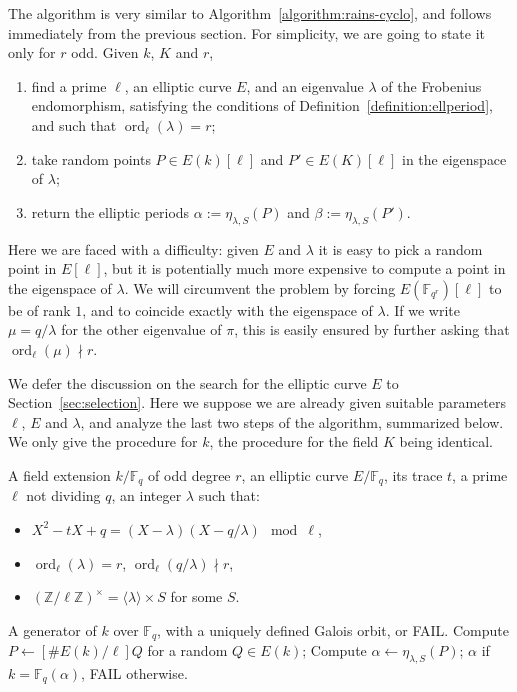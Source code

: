 \documentclass[12pt]{article}
\theoremstyle{plain}
\theoremstyle{definition}
\DeclareMathOperator{\order}{ord} %
\def\Z{\ensuremath{\mathbb{Z}}}
\def\F{\ensuremath{\mathbb{F}}}
\newcounter{algorithm}
\begin{document}
The algorithm is very similar to
Algorithm~\ref{algorithm:rains-cyclo}, and follows immediately from
the previous section. For simplicity, we are going to state it only
for $r$ odd. Given $k$, $K$ and $r$,
\begin{enumerate}
\item find a prime $\ell$, an elliptic curve $E$, and an eigenvalue
  $\lambda$ of the Frobenius endomorphism, satisfying the conditions
  of Definition~\ref{definition:ellperiod}, and such that
  $\order_\ell(\lambda)=r$;
\item take random points $P\in E(k)[\ell]$ and $P'\in E(K)[\ell]$ in
  the eigenspace of $\lambda$;
\item return the elliptic periods $\alpha := \eta_{\lambda,S}(P)$ and
  $\beta:= \eta_{\lambda,S}(P')$.
\end{enumerate}

Here we are faced with a difficulty: given $E$ and $\lambda$ it is
easy to pick a random point in $E[\ell]$, but it is potentially much
more expensive to compute a point in the eigenspace of $\lambda$. We
will circumvent the problem by forcing $E(\F_{q^r})[\ell]$ to be of
rank $1$, and to coincide exactly with the eigenspace of $\lambda$.
If we write $\mu = q/\lambda$ for the other eigenvalue of $\pi$, this
is easily ensured by further asking that $\order_\ell(\mu) \nmid r$.

We defer the discussion on the search for the elliptic curve $E$ to
Section~\ref{sec:selection}. Here we suppose we are already given
suitable parameters $\ell$, $E$ and $\lambda$, and analyze the last
two steps of the algorithm, summarized below.  We only give the
procedure for $k$, the procedure for the field $K$ being
identical.

\begin{algorithm}
\label{algorithm:compell}
  \begin{algorithmic}[1]
    \REQUIRE A field extension $k/\F_q$ of odd degree $r$,
    an elliptic curve $E/\F_q$, its trace $t$, a prime $\ell$ not dividing $q$,
    an integer $\lambda$ such that:
    \begin{itemize}
    \item $X^2 - tX + q = (X-\lambda)(X-q/\lambda) \mod\ell$,
    \item $\order_\ell(\lambda)=r$, $\order_\ell(q/\lambda)\nmid r$,
    \item $(\Z/\ell\Z)^{\times} = \langle{\lambda}\rangle \times S$ for some $S$.
    \end{itemize}
    \ENSURE A generator of $k$ over $\F_q$, with a uniquely defined Galois orbit, or FAIL.
    \REPEAT
    \STATE Compute $P\leftarrow[\# E(k)/\ell]Q$ for a random $Q\in E(k)$;
    \STATE Compute $\alpha\leftarrow\eta_{\lambda,S}(P)$;
    \RETURN $\alpha$ if $k=\F_q(\alpha)$, FAIL otherwise.
  \end{algorithmic}
\end{algorithm}
\end{document}
